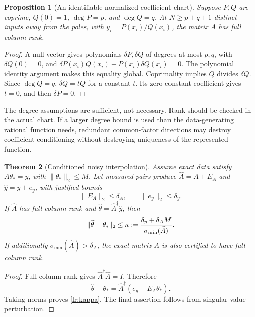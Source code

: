 \documentclass[11pt]{article}
\newtheorem{theorem}{Theorem}[section]
\newtheorem{proposition}[theorem]{Proposition}
\theoremstyle{definition}
\begin{document}
\begin{proposition}[An identifiable normalized coefficient chart]
\label{lr:coefficient-identifiable}
Suppose $P,Q$ are coprime, $Q(0)=1$, $\deg P=p$, and $\deg Q=q$.
At $N\geq p+q+1$ distinct inputs away from the poles, with
$y_i=P(x_i)/Q(x_i)$, the matrix $A$ has full column rank.
\end{proposition}
\begin{proof}
A null vector gives polynomials $\delta P,\delta Q$ of degrees at most
$p,q$, with $\delta Q(0)=0$, and
$\delta P(x_i)Q(x_i)-P(x_i)\delta Q(x_i)=0$.
The polynomial identity argument makes this equality global.
Coprimality implies $Q$ divides $\delta Q$. Since $\deg Q=q$,
$\delta Q=tQ$ for a constant $t$. Its zero constant coefficient gives
$t=0$, and then $\delta P=0$.
\end{proof}

The degree assumptions are sufficient, not necessary. Rank should be
checked in the actual chart. If a larger degree bound is used than the
data-generating rational function needs, redundant common-factor
directions may destroy coefficient conditioning without destroying
uniqueness of the represented function.

\begin{theorem}[Conditioned noisy interpolation]
\label{lr:noisy-interpolation}
Assume exact data satisfy $A\theta_*=y$, with
$\|\theta_*\|_2\leq M$. Let measured pairs produce
$\widehat A=A+E_A$ and $\widehat y=y+e_y$, with justified bounds
\[
 \|E_A\|_2\leq\delta_A,
 \qquad\|e_y\|_2\leq\delta_y.
\]
If $\widehat A$ has full column rank and
$\widehat\theta=\widehat A^\dagger\widehat y$, then
\begin{equation}
 \|\widehat\theta-\theta_*\|_2
 \leq\kappa:={\delta_y+\delta_A M\over
                     \sigma_{\min}(\widehat A)}.
 \label{lr:kappa}
\end{equation}
If additionally $\sigma_{\min}(\widehat A)>\delta_A$, the exact
matrix $A$ is also certified to have full column rank.
\end{theorem}
\begin{proof}
Full column rank gives $\widehat A^\dagger\widehat A=I$. Therefore
\[
 \widehat\theta-\theta_*
 =\widehat A^\dagger(e_y-E_A\theta_*).
\]
Taking norms proves \eqref{lr:kappa}. The final assertion follows from
singular-value perturbation.
\end{proof}
\end{document}

